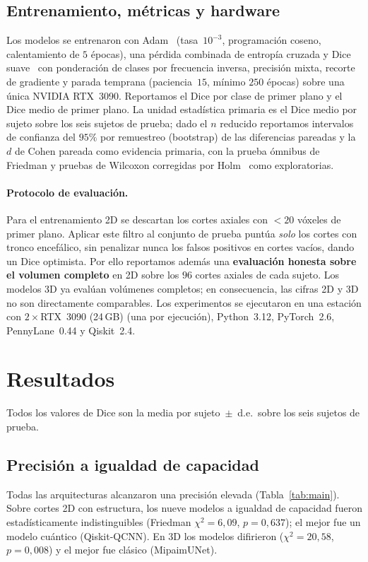 \documentclass[runningheads]{llncs}
\begin{document}
\subsection{Entrenamiento, métricas y hardware}
Los modelos se entrenaron con Adam~\cite{adam} (tasa~$10^{-3}$, programación
coseno, calentamiento de $5$ épocas), una pérdida combinada de entropía cruzada
y Dice suave~\cite{vnet} con ponderación de clases por frecuencia inversa,
precisión mixta, recorte de gradiente y parada temprana (paciencia~$15$,
mínimo $250$ épocas) sobre una única NVIDIA RTX~3090. Reportamos el Dice por
clase de primer plano y el Dice medio de primer plano. La unidad estadística
primaria es el Dice medio por sujeto sobre los seis sujetos de prueba; dado el
$n$ reducido reportamos intervalos de confianza del $95\%$ por remuestreo
(bootstrap) de las diferencias pareadas y la $d$ de Cohen pareada como evidencia
primaria, con la prueba ómnibus de Friedman y pruebas de Wilcoxon corregidas por
Holm~\cite{nonparam} como exploratorias.

\paragraph{Protocolo de evaluación.} Para el entrenamiento 2D se descartan los
cortes axiales con $<20$ vóxeles de primer plano. Aplicar este filtro al
conjunto de prueba puntúa \emph{solo} los cortes con tronco encefálico, sin
penalizar nunca los falsos positivos en cortes vacíos, dando un Dice optimista.
Por ello reportamos además una \textbf{evaluación honesta sobre el volumen
completo} en 2D sobre los $96$ cortes axiales de cada sujeto. Los modelos 3D ya
evalúan volúmenes completos; en consecuencia, las cifras 2D y 3D no son
directamente comparables. Los experimentos se ejecutaron en una estación con
$2{\times}$RTX~3090 (24\,GB) (una por ejecución), Python~3.12, PyTorch~2.6,
PennyLane~0.44 y Qiskit~2.4.

\section{Resultados}
Todos los valores de Dice son la media por sujeto~$\pm$~d.e.\ sobre los seis
sujetos de prueba.

\subsection{Precisión a igualdad de capacidad}
Todas las arquitecturas alcanzaron una precisión elevada
(Tabla~\ref{tab:main}). Sobre cortes 2D con estructura, los nueve modelos a
igualdad de capacidad fueron estadísticamente indistinguibles
(Friedman $\chi^2{=}6{,}09$, $p{=}0{,}637$); el mejor fue un modelo cuántico
(Qiskit-QCNN). En 3D los modelos difirieron ($\chi^2{=}20{,}58$,
$p{=}0{,}008$) y el mejor fue clásico (MipaimUNet).
\end{document}
